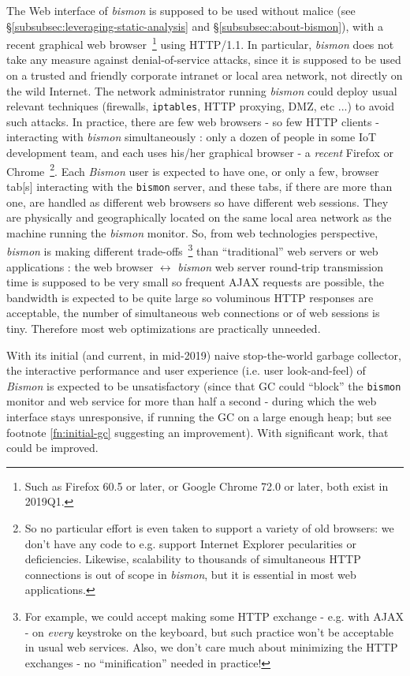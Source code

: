 The Web interface  of \emph{bismon} is supposed
to be used without malice (see
§\ref{subsubsec:leveraging-static-analysis} and
§\ref{subsubsec:about-bismon}), with a recent graphical web
browser~\footnote{Such as Firefox 60.5 or later, or Google Chrome 72.0
  or later, both exist in 2019Q1.}  using HTTP/1.1. In particular,
\emph{bismon} does not take any measure against
 denial-of-service attacks, since it is
supposed to be used on a trusted and friendly corporate intranet or
local area network, not directly on the wild Internet. The network
administrator running \emph{bismon} could deploy usual relevant
techniques (firewalls, \texttt{iptables}, HTTP proxying, DMZ, etc ...)
to avoid such attacks. In practice, there are few web browsers - so
few HTTP clients - interacting with \emph{bismon} simultaneously :
only a dozen of people in some IoT development team, and each uses
his/her graphical browser  - a \emph{recent} Firefox or
Chrome~\footnote{So no particular effort is even taken to support a
  variety of old browsers: we don't have any code to e.g. support
  Internet Explorer pecularities or deficiencies. Likewise,
  scalability to thousands of simultaneous HTTP connections is out of
  scope in \emph{bismon}, but it is essential in most web
  applications.}. Each \emph{Bismon} user is expected to have one, or
only a few, browser tab[s] interacting with the \texttt{bismon}
server, and these tabs, if there are more than one, are handled as
different web browsers so have different web sessions.  They are
physically and geographically located on the same local area network
as the machine running the \emph{bismon} monitor. So, from web
technologies perspective, \emph{bismon} is making different
trade-offs~\footnote{For example, we could accept making some HTTP
  exchange - e.g. with AJAX - on \emph{every} keystroke on the
  keyboard, but such practice won't be acceptable in usual web
  services. Also, we don't care much about minimizing the HTTP
  exchanges - no ``minification'' needed in practice!} than
``traditional'' web servers or web applications : the web browser
$\leftrightarrow$ \emph{bismon} web server round-trip transmission
time is supposed to be very small so frequent AJAX requests are
possible, the bandwidth is expected to be quite large so voluminous
HTTP responses are acceptable, the number of simultaneous web
connections or of web sessions is tiny. Therefore most web
optimizations are practically unneeded.

With its initial (and current, in mid-2019) naive stop-the-world
garbage collector, the interactive performance and user experience
(i.e. user look-and-feel) of \emph{Bismon} is expected to be
unsatisfactory (since that GC could ``block'' the \texttt{bismon}
monitor and web service for more than half a second - during which the
web interface stays unresponsive, if running the GC on a large enough
heap; but see footnote \ref{fn:initial-gc} suggesting an
improvement). With significant work, that could be improved.

